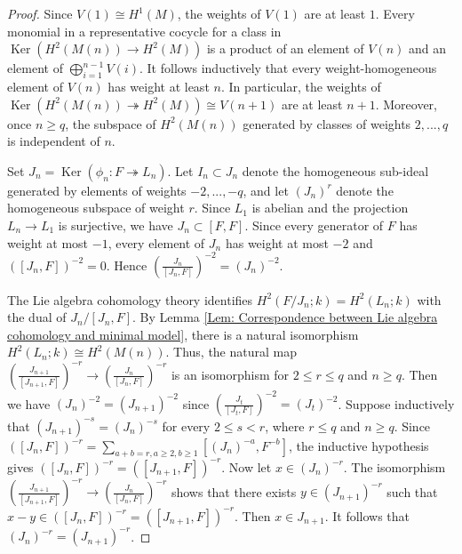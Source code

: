\documentclass[11pt]{amsart}
\theoremstyle{definition}
\numberwithin{equation}{section}
\numberwithin{equation}{section}
\DeclareMathOperator{\Ker}{Ker}
\begin{document}
\begin{proof}
Since $V(1)\cong H^1(M)$, the weights of $V(1)$ are at least $1$.
Every monomial in a representative cocycle for a class in $\Ker(H^2(M(n))\rightarrow H^2(M))$ is a product of an element of $V(n)$ and an element of $\bigoplus_{i=1}^{n-1} V(i)$. It follows inductively that every weight-homogeneous element of $V(n)$ has weight at least $n$. In particular, the weights of $\Ker(H^2(M(n))\twoheadrightarrow H^2(M))\cong V(n+1)$ are at least $n+1$. Moreover, once $n\geq q$, the subspace of $H^2(M(n))$ generated by classes of weights $2,...,q$ is independent of $n$. 

Set $J_n=\Ker(\phi_n:F\twoheadrightarrow L_n)$. Let $I_n\subset J_n$ denote the homogeneous sub-ideal generated by elements of weights $-2,...,-q$, and let $(J_n)^r$ denote the homogeneous subspace of weight $r$. Since $L_1$ is abelian and the projection $L_n\rightarrow L_1$ is surjective, we have $J_n\subset [F,F]$. Since every generator of $F$ has weight at most $-1$, every element of $J_n$ has weight at most $-2$ and $([J_n,F])^{-2}=0$. Hence $(\frac{J_{n}}{[J_{n},F]})^{-2}=(J_n)^{-2}$.

The Lie algebra cohomology theory identifies $H^2(F/J_n;k)=H^2(L_n;k)$ with the dual of $J_n/[J_n,F]$. By Lemma \ref{Lem: Correspondence between Lie algebra cohomology and minimal model}, there is a natural isomorphism  $H^2(L_n;k)\cong H^2(M(n))$. Thus, the natural map $(\frac{J_{n+1}}{[J_{n+1},F]})^{-r}\rightarrow (\frac{J_{n}}{[J_{n},F]})^{-r}$ is an isomorphism for $2\leq r\leq q$ and $n\geq q$. Then we have $(J_n)^{-2}=(J_{n+1})^{-2}$ since $(\frac{J_{t}}{[J_{t},F]})^{-2}=(J_t)^{-2}$. Suppose inductively that $(J_{n+1})^{-s}=(J_{n})^{-s}$ for every $2\leq s<r$, where $r\leq q$ and $n\geq q$. Since $([J_n,F])^{-r}=\sum_{a+b=r,a\geq 2, b\geq 1}[(J_n)^{-a},F^{-b}]$, the inductive hypothesis gives $([J_n,F])^{-r}=([J_{n+1},F])^{-r}$. Now let $x\in (J_n)^{-r}$. The isomorphism $(\frac{J_{n+1}}{[J_{n+1},F]})^{-r}\rightarrow (\frac{J_{n}}{[J_{n},F]})^{-r}$ shows that there exists $y\in (J_{n+1})^{-r}$ such that $x-y\in ([J_n,F])^{-r}=([J_{n+1},F])^{-r}$. Then $x\in J_{n+1}$. It follows that $(J_n)^{-r}=(J_{n+1})^{-r}$.


\end{proof}
\end{document}
